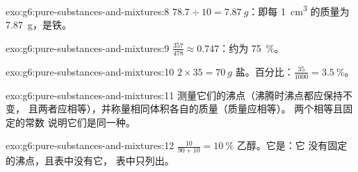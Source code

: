 \begin{solution}{exo:g6:pure-substances-and-mixtures:8}
$78.7 \div 10 = \qty{7.87}{g}$：即每 \qty{1}{cm^3} 的质量为 \qty{7.87}{g}，是铁。
\end{solution}

\begin{solution}{exo:g6:pure-substances-and-mixtures:9}
$\frac{357}{478} \approx 0.747$：约为 \qty{75}{\percent}。
\end{solution}

\begin{solution}{exo:g6:pure-substances-and-mixtures:10}
$2 \times 35 = \qty{70}{g}$ 盐。百分比：$\frac{35}{1000} =
\qty{3.5}{\percent}$。
\end{solution}

\begin{solution}{exo:g6:pure-substances-and-mixtures:11}
测量它们的沸点（沸腾时沸点都应保持不变，
且两者应相等），并称量相同体积各自的质量（质量应相等）。
两个相等且固定的常数
说明它们是同一种。
\end{solution}

\begin{solution}{exo:g6:pure-substances-and-mixtures:12}
$\frac{10}{90 + 10} = \qty{10}{\percent}$ 乙醇。它是：它
没有固定的沸点，且表中没有它，
表中只列出。
\end{solution}

